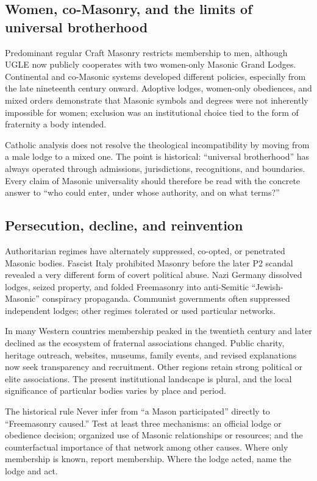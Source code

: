 \subsection{Women, co-Masonry, and the limits of universal brotherhood}

Predominant regular Craft Masonry restricts membership to men, although UGLE now publicly cooperates with two women-only Masonic Grand Lodges. Continental and co-Masonic systems developed different policies, especially from the late nineteenth century onward. Adoptive lodges, women-only obediences, and mixed orders demonstrate that Masonic symbols and degrees were not inherently impossible for women; exclusion was an institutional choice tied to the form of fraternity a body intended.

Catholic analysis does not resolve the theological incompatibility by moving from a male lodge to a mixed one. The point is historical: “universal brotherhood” has always operated through admissions, jurisdictions, recognitions, and boundaries. Every claim of Masonic universality should therefore be read with the concrete answer to “who could enter, under whose authority, and on what terms?”

\subsection{Persecution, decline, and reinvention}

Authoritarian regimes have alternately suppressed, co-opted, or penetrated Masonic bodies. Fascist Italy prohibited Masonry before the later P2 scandal revealed a very different form of covert political abuse. Nazi Germany dissolved lodges, seized property, and folded Freemasonry into anti-Semitic “Jewish-Masonic” conspiracy propaganda. Communist governments often suppressed independent lodges; other regimes tolerated or used particular networks.

In many Western countries membership peaked in the twentieth century and later declined as the ecosystem of fraternal associations changed. Public charity, heritage outreach, websites, museums, family events, and revised explanations now seek transparency and recruitment. Other regions retain strong political or elite associations. The present institutional landscape is plural, and the local significance of particular bodies varies by place and period.

\begin{studybox}{The historical rule}
Never infer from “a Mason participated” directly to “Freemasonry caused.” Test at least three mechanisms: an official lodge or obedience decision; organized use of Masonic relationships or resources; and the counterfactual importance of that network among other causes. Where only membership is known, report membership. Where the lodge acted, name the lodge and act.
\end{studybox}
